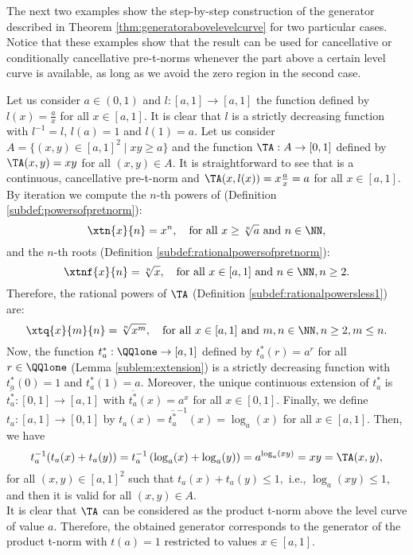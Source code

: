 The next two examples show the step-by-step construction of the generator described in Theorem \ref{thm:generatorabovelevelcurve} for two particular cases. Notice that these examples show that the result can be used for cancellative or conditionally cancellative pre-t-norms whenever the part above a certain level curve is available, as long as we avoid the zero region in the second case.

\begin{example}\label{ex:TP:construction-abovelevelcurve}
	Let us consider $a \in (0,1)$ and $l:[a,1] \to [a,1]$ the function defined by $l(x)=\frac{a}{x}$ for all $x \in [a,1]$. It is clear that $l$  is a strictly decreasing function with $l^{-1}=l$, $l(a)=1$ and $l(1)=a$. Let us consider $A=\{(x,y) \in [a,1]^2 \mid xy \geq a\}$ and the function $\TA: A \to [0,1]$ defined by $\TA(x,y)=xy$ for all $(x,y) \in A$. It is straightforward to see that \TA is a continuous, cancellative pre-t-norm and $\TA(x,l(x))=x\frac{a}{x}=a$ for all $x \in [a,1]$. By iteration we compute the $n$-th powers of \TA (Definition \ref{subdef:powersofpretnorm}):
	$$\xtn{x}{n}=x^n, \quad \text{for all } x \geq \sqrt[n]{a} \text{ and } n \in \NN,$$
	and the  $n$-th roots  (Definition \ref{subdef:rationalpowersofpretnorm}):
	$$\xtnf{x}{n} = \sqrt[n]{x}, \quad \text{for all } x \in [a,1] \text{ and } n \in \NN, n \geq 2.$$
	Therefore, the rational powers of $\TA$ (Definition \ref{subdef:rationalpowersless1}) are:
	$$\xtq{x}{m}{n} =  \sqrt[n]{x^m}, \quad \text{for all } x \in [a,1] \text{ and } m,n \in \NN,  n \geq 2, m \leq n.$$
	Now, the function $t_{a}^*: \QQlone \to [a,1]$ defined by $t_{a}^*(r)=a^r$ for all $r \in \QQlone$ (Lemma \ref{sublem:extension}) is a strictly decreasing function with $t_{a}^*(0)=1$ and $t_{a}^*(1)=a$. Moreover, the unique continuous extension of $t_{a}^*$ is $\overline{t_{a}^*}:[0,1] \to [a,1]$ with $\overline{t_{a}^*}(x)=a^x$ for all $x \in [0,1]$. Finally, we define $t_{a}:[a,1] \to [0,1]$ by $t_{a}(x)=\overline{t_{a}^*}^{-1}(x)=\log_a(x)$ for all $x \in [a,1]$. Then, we have
	$$t_{a}^{-1}(t_{a}(x)+t_{a}(y)) = t_{a}^{-1}\left(\log_a(x) + \log_a(y)\right) = a^{\log_a(xy)} = xy = \TA(x,y),$$
	for all $(x,y) \in [a,1]^2$ such that $t_a(x)+t_a(y)\leq 1,$ i.e.,  $\log_a(xy) \leq 1$, and then it is valid for all $(x,y) \in A$.\\
	It is clear that $\TA$ can be considered as the product t-norm above the level curve of value $a$. Therefore, the obtained generator corresponds to the generator of the product t-norm with $t(a)=1$ restricted to values $x \in  [a,1]$.
\end{example}

